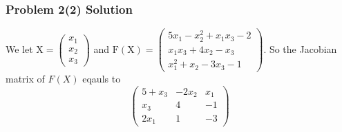 \documentclass{beamer}
\begin{document}
\begin{frame}
\frametitle{Problem 2(2) Solution}

We let $\mathrm{X}=\left(\begin{array}{l}
x_{1} \\
x_{2} \\
x_{3}
\end{array}\right)$
and
$\mathrm{F}(\mathrm{X})=\left(\begin{array}{c}
5 x_{1}-x_{2}^{2}+x_{1} x_{3}-2 \\
x_{1} x_{3}+4 x_{2}-x_{3} \\
x_{1}^{2}+x_{2}-3 x_{3}-1
\end{array}\right)$.
So the Jacobian matrix of $F(X)$ eqauls to
\begin{equation}
\left(\begin{array}{ccc}
5+x_{3} & -2 x_{2} & x_{1} \\
x_{3} & 4 & -1 \\
2 x_{1} & 1 & -3
\end{array}\right)
\end{equation}
\end{frame}
\end{document}
